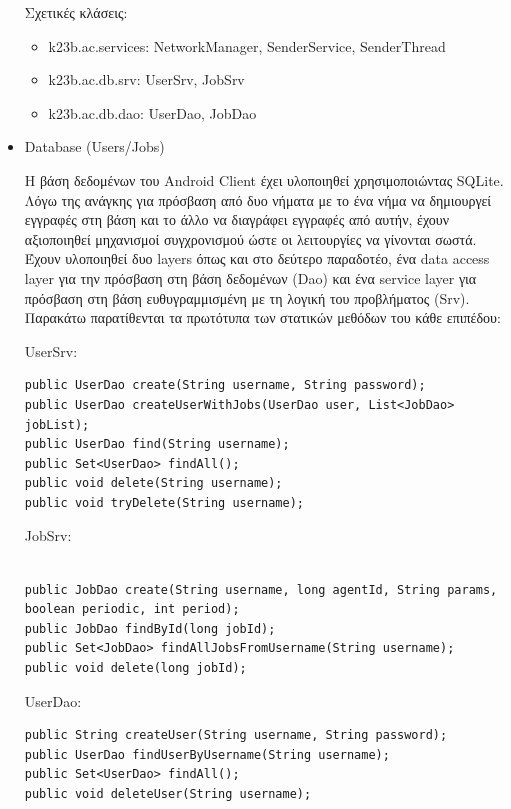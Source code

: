 \documentclass[a4paper,11pt]{article}
\begin{document}
\begin{sloppypar}
\begin{itemize}
Σχετικές κλάσεις:

\begin{itemize}

\item k23b.ac.services: NetworkManager, SenderService, SenderThread

\item k23b.ac.db.srv: UserSrv, JobSrv

\item k23b.ac.db.dao: UserDao, JobDao

\end{itemize}

\item{Database (Users/Jobs)}

Η βάση δεδομένων του Android Client έχει υλοποιηθεί χρησιμοποιώντας SQLite. Λόγω της ανάγκης για πρόσβαση από δυο νήματα με το ένα νήμα να δημιουργεί εγγραφές στη βάση και το άλλο να διαγράφει εγγραφές από αυτήν, έχουν αξιοποιηθεί μηχανισμοί συγχρονισμού ώστε οι λειτουργίες να γίνονται σωστά. Έχουν υλοποιηθεί δυο layers όπως και στο δεύτερο παραδοτέο, ένα data access layer για την πρόσβαση στη βάση δεδομένων (Dao) και ένα service layer για πρόσβαση στη βάση ευθυγραμμισμένη με τη λογική του προβλήματος (Srv). Παρακάτω παρατίθενται τα πρωτότυπα των στατικών μεθόδων του κάθε επιπέδου:

\newpage

UserSrv:
\begin{lstlisting}
public UserDao create(String username, String password);
public UserDao createUserWithJobs(UserDao user, List<JobDao> jobList);
public UserDao find(String username);
public Set<UserDao> findAll();
public void delete(String username);
public void tryDelete(String username);

\end{lstlisting}

JobSrv:
\begin{lstlisting}

public JobDao create(String username, long agentId, String params, boolean periodic, int period);
public JobDao findById(long jobId);
public Set<JobDao> findAllJobsFromUsername(String username);
public void delete(long jobId);

\end{lstlisting}

UserDao:

\begin{lstlisting}
public String createUser(String username, String password);
public UserDao findUserByUsername(String username);
public Set<UserDao> findAll();
public void deleteUser(String username);


\end{lstlisting}
\end{itemize}
\end{sloppypar}
\end{document}
